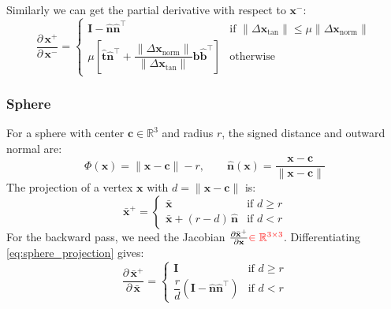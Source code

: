 \documentclass{article}
\newcommand{\pd}[2]{\dfrac{\partial\, #1}{\partial\, #2}}
\newcommand{\pdc}[2]{\frac{\partial #1}{\partial #2}}
\newcommand{\red}[1]{\textcolor{red}{#1}}
\begin{document}
Similarly we can get the partial derivative with respect to $\mathbf{x}^-$:
\begin{equation}
\label{eq:friction_gradient_xminus}
\pd{\mathbf{x}^+}{\mathbf{x}^-} =
\begin{cases}
\mathbf{I} - \hat{\mathbf{n}}\hat{\mathbf{n}}^\top
& \text{if } \|\Delta\mathbf{x}_{\text{tan}}\| \leq \mu\|\Delta\mathbf{x}_{\text{norm}}\| \\[1ex]
\mu\left[\hat{\mathbf{t}}\hat{\mathbf{n}}^\top +
\dfrac{\|\Delta\mathbf{x}_{\text{norm}}\|}{\|\Delta\mathbf{x}_{\text{tan}}\|}
\hat{\mathbf{b}}\hat{\mathbf{b}}^\top\right]
& \text{otherwise}
\end{cases}
\end{equation}

\subsubsection{Sphere}
For a sphere with center $\mathbf{c} \in \mathbb{R}^3$ and radius $r$, the signed distance and outward normal are:
\begin{equation*}
    \Phi(\mathbf{x}) = \|\mathbf{x} - \mathbf{c}\| - r,
    \qquad
    \hat{\mathbf{n}}(\mathbf{x}) = \frac{\mathbf{x} - \mathbf{c}}{\|\mathbf{x} - \mathbf{c}\|}
\end{equation*}
The projection of a vertex $\mathbf{x}$ with $d = \|\mathbf{x} - \mathbf{c}\|$ is:
\begin{equation}
\label{eq:sphere_projection}
    \bar{\mathbf{x}}^+ = \begin{cases}
        \bar{\mathbf{x}} & \text{if } d \geq r \\
        \bar{\mathbf{x}} + (r - d)\,\hat{\mathbf{n}} & \text{if } d < r
    \end{cases}
\end{equation}
\newline For the backward pass, we need the Jacobian $\pdc{\bar{\mathbf{x}}^+}{\mathbf{x}} \red{\in \mathbb{R}^{3\times 3}}$. Differentiating
\eqref{eq:sphere_projection} gives:
\begin{equation}
    \pd{\bar{\mathbf{x}}^+}{\bar{\mathbf{x}}} =
    \begin{cases}
        \mathbf{I} & \text{if } d \geq r \\[1ex]
        \dfrac{r}{d}\left(\mathbf{I} - \hat{\mathbf{n}}\hat{\mathbf{n}}^\top\right) & \text{if } d < r
    \end{cases}
\end{equation}
\end{document}
